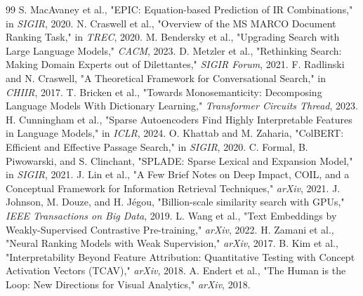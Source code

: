 \documentclass[sigconf,authordraft]{acmart}
\begin{document}
\begin{thebibliography}{99}
 S. MacAvaney et al., "EPIC: Equation-based Prediction of IR Combinations," in \textit{SIGIR}, 2020.
 N. Craswell et al., "Overview of the MS MARCO Document Ranking Task," in \textit{TREC}, 2020.
 M. Bendersky et al., "Upgrading Search with Large Language Models," \textit{CACM}, 2023.
 D. Metzler et al., "Rethinking Search: Making Domain Experts out of Dilettantes," \textit{SIGIR Forum}, 2021.
 F. Radlinski and N. Craswell, "A Theoretical Framework for Conversational Search," in \textit{CHIIR}, 2017.
 T. Bricken et al., "Towards Monosemanticity: Decomposing Language Models With Dictionary Learning," \textit{Transformer Circuits Thread}, 2023.
 H. Cunningham et al., "Sparse Autoencoders Find Highly Interpretable Features in Language Models," in \textit{ICLR}, 2024.
 O. Khattab and M. Zaharia, "ColBERT: Efficient and Effective Passage Search," in \textit{SIGIR}, 2020.
 C. Formal, B. Piwowarski, and S. Clinchant, "SPLADE: Sparse Lexical and Expansion Model," in \textit{SIGIR}, 2021.
 J. Lin et al., "A Few Brief Notes on Deep Impact, COIL, and a Conceptual Framework for Information Retrieval Techniques," \textit{arXiv}, 2021.
 J. Johnson, M. Douze, and H. Jégou, "Billion-scale similarity search with GPUs," \textit{IEEE Transactions on Big Data}, 2019.
 L. Wang et al., "Text Embeddings by Weakly-Supervised Contrastive Pre-training," \textit{arXiv}, 2022.
 H. Zamani et al., "Neural Ranking Models with Weak Supervision," \textit{arXiv}, 2017.
 B. Kim et al., "Interpretability Beyond Feature Attribution: Quantitative Testing with Concept Activation Vectors (TCAV)," \textit{arXiv}, 2018.
 A. Endert et al., "The Human is the Loop: New Directions for Visual Analytics," \textit{arXiv}, 2018.
\end{thebibliography}
\end{document}
